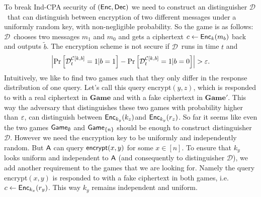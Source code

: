 \documentclass{article}
\def\A{{\sf A}}
\def\a{${\mathcal D}$}
\newcommand{\encrypt}{{\sf encrypt}}
\newcommand{\game}{{\sf Game}}
\newcommand{\dgame}{{\mathbf{Game}}}
\begin{document}
To break Ind-CPA security of $({\sf Enc},{\sf Dec})$ we need to construct an distinguisher \a~that can distinguish between encryption of two different messages under a uniformly random key, with non-negligible probability. So the game is as follows: \a~chooses two messages $m_1$ and $m_0$ and gets a ciphertext $c\leftarrow {\sf Enc}_k(m_b)$ back and outputs $\tilde{b}$. The encryption scheme is not secure if \a~runs in time $t$ and
\[\abs{\prob{{\mathcal D}_{t}^{\mathcal{C}[k,b]}=1|b=1}-\prob{{\mathcal D}_{t}^{\mathcal{C}[k,b]}=1|b=0}}>\eps.\]
Intuitively, we like to find two games such that they only differ in the response distribution of one query. Let's  call this query \encrypt$(y,z)$, which is responded to with a real ciphertext in $\dgame$ and with a fake ciphertext in $\dgame'$. This way the adversary that distinguishes these two games with probability higher than $\varepsilon$, can distinguish between ${\sf Enc}_{k_y}(k_z)$and ${\sf Enc}_{k_y}(r_z)$. So far it seems like even the two games $\game_{\emptyset}$ and $\game_{\cub{n}}$ should be enough to construct distinguisher \a. However we need the encryption key to be uniformly and independently random. But $\A$ can query $\encrypt(x,y)$ for some $x \in [n]$. To ensure that $k_y$ looks uniform and independent to $\A$ (and consequently to distinguisher \a), we add another requirement to the games that we are looking for. Namely the query \encrypt$(x,y)$ is responded to with a fake ciphertext in both games, i.e. $c \leftarrow {\sf Enc}_{k_x}(r_y)$. This way $k_y$ remains independent and uniform. \\
\end{document}
